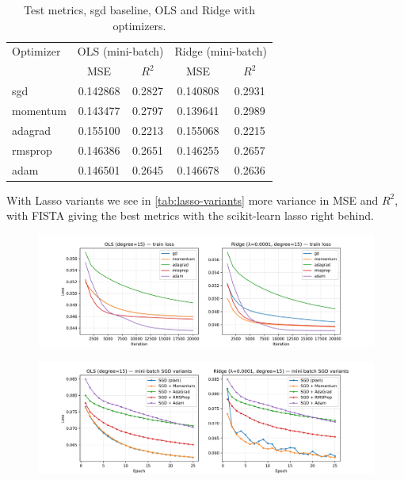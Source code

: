 \documentclass[amssymb,twocolumn,aps]{revtex4-2}
\begin{document}
\begin{table}[h!]
\caption{Test metrics, sgd baseline, OLS and Ridge with optimizers.}
\label{tab:mb-optimizers-1000}
\begin{ruledtabular}
\begin{tabular}{lcccc} 
Optimizer & \multicolumn{2}{c}{OLS (mini-batch)} & \multicolumn{2}{c}{Ridge (mini-batch)} \\
\colrule
 & MSE & $R^2$ & MSE & $R^2$ \\
\colrule
sgd       & 0.142868 & 0.2827 & 0.140808 & 0.2931 \\
momentum  & 0.143477 & 0.2797 & 0.139641 & 0.2989 \\
adagrad   & 0.155100 & 0.2213 & 0.155068 & 0.2215 \\
rmsprop   & 0.146386 & 0.2651 & 0.146255 & 0.2657 \\
adam      & 0.146501 & 0.2645 & 0.146678 & 0.2636 \\
\end{tabular}
\end{ruledtabular}
\end{table}

With Lasso variants we see in \ref{tab:lasso-variants} more variance in MSE and $R^2$, with FISTA giving the best metrics with the scikit-learn lasso right behind. 

\begin{figure}[H]
    \centering
    \includegraphics[width=1\linewidth]{Project-1/Figures/Part_c_d_e_f_GD_optimizers_loss_curves.png}
    \caption{}
    \label{fig:gd_optimizers}
\end{figure}

\begin{figure}[H]
    \centering
    \includegraphics[width=1\linewidth]{Project-1/Figures/Part_f_SGD_all_optimizers_loss_curves.png}
    \caption{}
    \label{fig:sgd_optimizers}
\end{figure}
\end{document}

